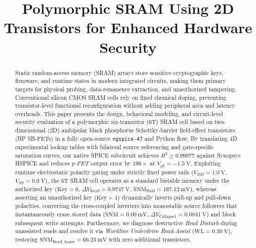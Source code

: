 \documentclass[conference]{IEEEtran}
\begin{document}
\title{Polymorphic SRAM Using 2D Transistors for Enhanced Hardware Security}

\author{
\and
{}
\and
{}
\and
{}
}

\maketitle

\begin{abstract}
Static random-access memory (SRAM) arrays store sensitive cryptographic keys, firmware, and runtime states in modern integrated circuits, making them primary targets for physical probing, data-remanence extraction, and unauthorized tampering. Conventional silicon CMOS SRAM cells rely on fixed chemical doping, preventing transistor-level functional reconfiguration without adding peripheral area and latency overheads. This paper presents the design, behavioral modeling, and circuit-level security evaluation of a polymorphic six-transistor (6T) SRAM cell based on two-dimensional (2D) ambipolar black phosphorus Schottky-barrier field-effect transistors (BP SB-FETs) in a fully open-source \texttt{ngspice-47} and Python flow. By translating 4D experimental lookup tables with bilateral source referencing and gate-specific saturation curves, our native SPICE subcircuit achieves $R^2 \ge 0.99977$ against Synopsys HSPICE and reduces \textit{p-FET} output error by $196\times$ at $V_{g2}=-1.5\ \text{V}$. Exploiting runtime electrostatic polarity gating under strictly fixed power rails ($V_{DD}=1.0\ \text{V}$, $V_{SS}=0.0\ \text{V}$), the 6T SRAM cell operates as a standard bistable memory under the authorized key ($\text{Key}=0$, $\Delta V_{\mathrm{Key0}}=0.9747\ \text{V}$, $\mathrm{SNM}_{\mathrm{Hold}}=167.12\ \text{mV}$), whereas asserting an unauthorized key ($\text{Key}=1$) dynamically inverts pull-up and pull-down polarities, converting the cross-coupled inverters into monostable source followers that instantaneously erase stored data ($\mathrm{SNM}=0.00\ \text{mV}$, $\Delta V_{\mathrm{Collapse1}}=0.0841\ \text{V}$) and block subsequent write attempts. Furthermore, we diagnose destructive \textit{Read Disturb} during unassisted reads and resolve it via \textit{Wordline Underdrive Read-Assist} ($\mathrm{WL}=0.30\ \text{V}$), restoring $\mathrm{SNM}_{\mathrm{Read,Assist}}=66.23\ \text{mV}$ with zero additional transistors.
\end{abstract}
\end{document}
